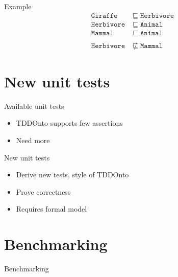 \documentclass[17pt,mathserif]{beamer}
\newcommand{\oclass}[1]{\ensuremath{\mathtt{#1}}}
\newcommand{\osub}{\sqsubseteq}
\newcommand{\onsub}{\not\sqsubseteq}
\begin{document}
\begin{frame}[t]{Example}
  \begin{align*}
    \oclass{Giraffe} &\osub \oclass{Herbivore} \\
    \oclass{Herbivore} &\osub \oclass{Animal} \\
    \oclass{Mammal} &\osub \oclass{Animal} \\
    \\
    \oclass{Herbivore} &\onsub \oclass{Mammal}
  \end{align*}
\end{frame}

\section{New unit tests}

\begin{frame}{Available unit tests}
  \begin{itemize}
    \item TDDOnto supports few assertions
    \item Need more
  \end{itemize}
\end{frame}

\begin{frame}{New unit tests}
  \begin{itemize}
    \item Derive new tests, style of TDDOnto
    \item Prove correctness
    \item Requires formal model
  \end{itemize}
\end{frame}

\section{Benchmarking}

\begin{frame}{Benchmarking}
\end{frame}
\end{document}
